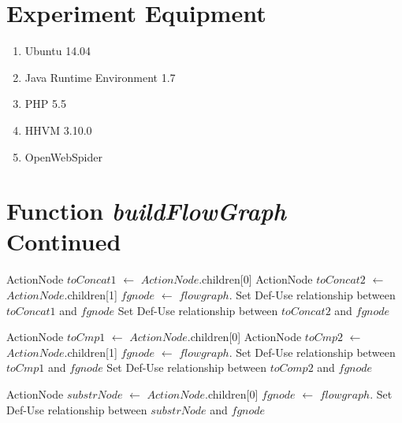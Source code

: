 \begin{appendices}



\chapter{Experiment Equipment}
\begin{enumerate}
\item Ubuntu 14.04
\item Java Runtime Environment 1.7
\item PHP 5.5
\item HHVM 3.10.0
\item OpenWebSpider
\end{enumerate}

\chapter{Function \textit{buildFlowGraph} Continued}
\label{appendix:algorithm}

\begin{algorithm}
\begin{algorithmic}[1]
      \State ActionNode $toConcat1$ $\gets$ $ActionNode$.children[0]
      \State ActionNode $toConcat2$ $\gets$ $ActionNode$.children[1]
      \State $fgnode$ $\gets$ $flowgraph$.
      \State Set Def-Use relationship between $toConcat1$ and $fgnode$
      \State Set Def-Use relationship between $toConcat2$ and $fgnode$
    \EndCase

      \State ActionNode $toCmp1$ $\gets$ $ActionNode$.children[0]
      \State ActionNode $toCmp2$ $\gets$ $ActionNode$.children[1]
      \State $fgnode$ $\gets$ $flowgraph$.
      \State Set Def-Use relationship between $toCmp1$ and $fgnode$
      \State Set Def-Use relationship between $toComp2$ and $fgnode$
    \EndCase

      \State ActionNode $substrNode$ $\gets$ $ActionNode$.children[0]
      \State $fgnode$ $\gets$ $flowgraph$.
      \State Set Def-Use relationship between $substrNode$ and $fgnode$
    \EndCase


\end{algorithmic}
\end{algorithm}
\end{appendices}
